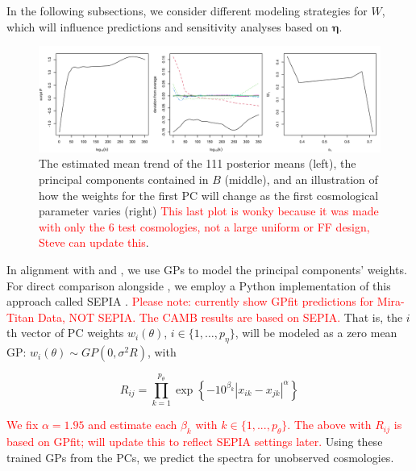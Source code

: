 \documentclass[11pt]{article}
\begin{document}
In the following subsections, we consider different modeling strategies for $W$, 
which will influence predictions and sensitivity analyses based on $\boldsymbol\eta$.

\begin{figure}
    \centering
    \includegraphics[width=\textwidth]{mean_PCs_oneW.png}
    \caption{The estimated mean trend of the 111 posterior means (left), the principal 
    components contained in $B$ (middle), and an illustration of how the weights 
    for the first PC will change as the first cosmological parameter varies (right) 
    \textcolor{red}{This last plot is wonky because it was made with only the 6 test 
    cosmologies, not a large uniform or FF design, Steve can update this}.}
    \label{fig:mean_PCs_oneW}
\end{figure}



In alignment with \cite{heitmann2009coyote} and \cite{higdon2010estcosmo}, we use 
GPs to model the principal components' weights. For direct comparison alongside
\cite{moran2023mira}, we employ a Python implementation of this approach called 
SEPIA \citep{gattiker2020sepia}. \textcolor{red}{Please note: currently show GPfit 
predictions for Mira-Titan Data, NOT SEPIA. The CAMB results are based on SEPIA.}
That is, the $i$th vector of PC weights $w_i(\theta)$, 
$i \in \{1,\ldots,p_\eta\}$, will be modeled as a zero mean GP: 
$w_i(\theta) \sim GP(0, \sigma^2R)$, with

\begin{equation*}
    R_{ij} = \prod_{k=1}^{p_\theta}\exp\left\{-10^{\beta_k}|x_{ik}-x_{jk}|^\alpha\right\}
\end{equation*}

\textcolor{red}{We fix $\alpha=1.95$ and estimate each $\beta_k$ with $k \in \{1,...,p_\theta\}$. 
The above with $R_{ij}$ is based on GPfit; will update this to reflect SEPIA settings later.}
Using these trained GPs from the PCs, we predict the spectra for unobserved cosmologies.
\end{document}
